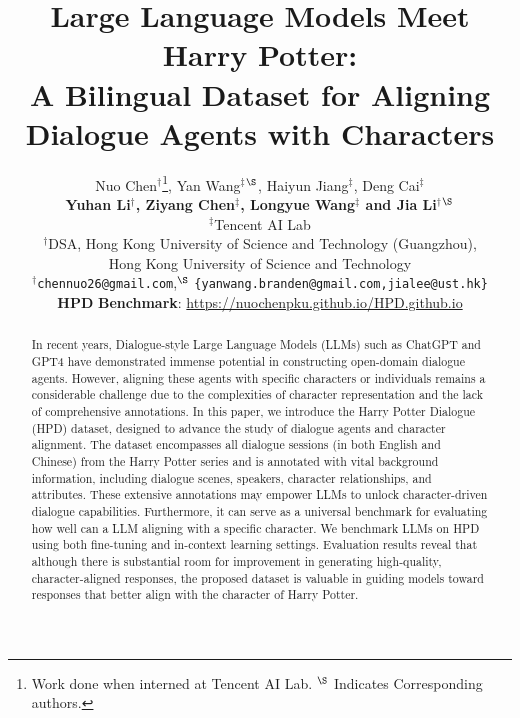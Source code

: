 \documentclass[11pt]{article}
\title{Large Language Models Meet Harry Potter: \\A Bilingual Dataset for Aligning Dialogue Agents with Characters}
\author{Nuo Chen$^\dag$\thanks{\; Work done when interned at Tencent AI Lab. $^{\S}$ Indicates Corresponding authors.}, Yan Wang$^\ddag$$^{\S}$, Haiyun Jiang$^\ddag$, Deng Cai$^\ddag$\\ 
\textbf{Yuhan Li$^\dag$, Ziyang Chen$^\ddag$, Longyue Wang$^\ddag$ and Jia Li$^\dag$$^{\S}$}
\\
$^\ddag$Tencent AI Lab \\
$^\dag$DSA, Hong Kong University of Science and Technology (Guangzhou),\\ Hong Kong University of Science and Technology \\
$^\dag$\texttt{chennuo26@gmail.com},$^{\S}$  \texttt{\{yanwang.branden@gmail.com,jialee@ust.hk\}}
 \\
\textbf{HPD} \textbf{Benchmark}: \url{https://nuochenpku.github.io/HPD.github.io}}
\begin{document}
\maketitle
\begin{abstract}








In recent years, Dialogue-style Large Language Models (LLMs) such as ChatGPT and GPT4 have demonstrated immense potential in constructing open-domain dialogue agents. However, aligning these agents with specific characters or individuals remains a considerable challenge due to the complexities of character representation and the lack of comprehensive annotations. In this paper, we introduce the Harry Potter Dialogue (HPD) dataset, designed to advance the study of dialogue agents and character alignment. The dataset encompasses all dialogue sessions (in both English and Chinese) from the Harry Potter series and is annotated with vital background information, including dialogue scenes, speakers, character relationships, and attributes. These extensive annotations may empower LLMs to unlock character-driven dialogue capabilities. Furthermore, it can serve as a universal benchmark for evaluating how well can a LLM aligning with a specific character. We benchmark LLMs on HPD using both fine-tuning and in-context learning settings. Evaluation results reveal that although there is substantial room for improvement in generating high-quality, character-aligned responses, the proposed dataset is valuable in guiding models toward responses that better align with the character of Harry Potter.























\end{abstract}
\end{document}
